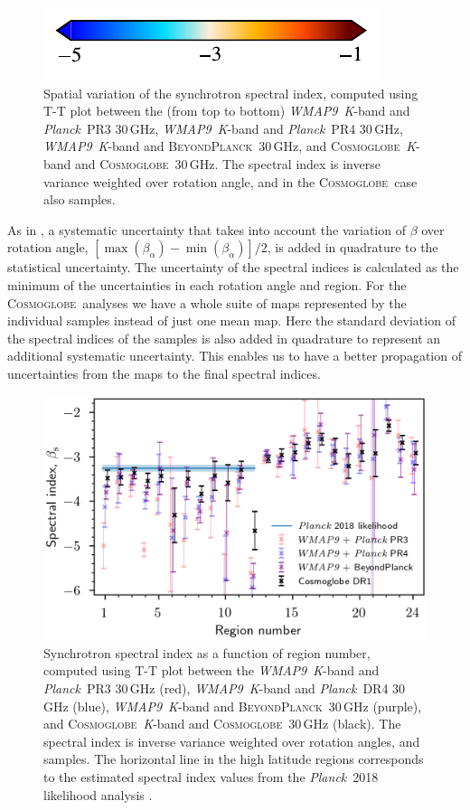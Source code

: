 \documentclass[twocolumn]{../../common/aa}
\def\WMAPnine{\emph{WMAP9}}
\def\Planck{\emph{Planck}}
\newcommand{\BP}{\textsc{BeyondPlanck}}
\newcommand{\Cosmoglobe}{\textsc{Cosmoglobe}}
\newcommand{\K}[0]{\textit K}
\begin{document}
\begin{figure}
	\hspace{0.25cm}\includegraphics{figures/cbar_beta_wide.pdf}
	\caption{Spatial variation of the synchrotron spectral index, computed using T-T plot between the (from top to bottom) \WMAPnine\ \K-band and \Planck\ PR3 30\,GHz, \WMAPnine\ \K-band and \Planck\ PR4 30\,GHz, \WMAPnine\ \K-band and \BP\ 30\,GHz, and \Cosmoglobe\ \K-band and \Cosmoglobe\ 30\,GHz. The spectral index is inverse variance weighted over rotation angle, and in the \Cosmoglobe\ case also samples.}
        \label{fig:TT_beta_maps}
\end{figure}

As in \citet{fuskeland:2019}, a systematic uncertainty that takes into account the variation of $\beta$ over rotation angle, $[ \max(\beta_\alpha) - \min(\beta_\alpha) ] /2$, is added in quadrature to the statistical uncertainty.
The uncertainty of the spectral indices is calculated as the minimum of the uncertainties in each rotation angle and region. 
For the \Cosmoglobe\ analyses we have a whole suite of maps represented by the individual samples instead of just one mean map. Here the standard deviation of the spectral indices of the samples is also added in quadrature to represent an additional systematic uncertainty. This enables us to have a better propagation of uncertainties from the maps to the final spectral indices.

\begin{figure}
        \centering
        \includegraphics[width=\linewidth]{figures/cos30_region_beta_cosmoglobe_vs_wmap_all.png}
        \caption{Synchrotron spectral index as a function of region number, computed using T-T plot between the \WMAPnine\ \K-band and \Planck\ PR3 30\,GHz (red), \WMAPnine\ \K-band and \Planck\ DR4 30\,GHz (blue), \WMAPnine\ \K-band and \BP\ 30\,GHz (purple), and \Cosmoglobe\ \K-band and \Cosmoglobe\ 30\,GHz (black). The spectral index is inverse variance weighted over rotation angles, and samples. The horizontal line in the high latitude regions corresponds to the estimated spectral index values from the \Planck\ 2018 likelihood analysis \citep{planck2016-l05}. }
        \label{fig:cos30_beta_region}
\end{figure}
\end{document}

